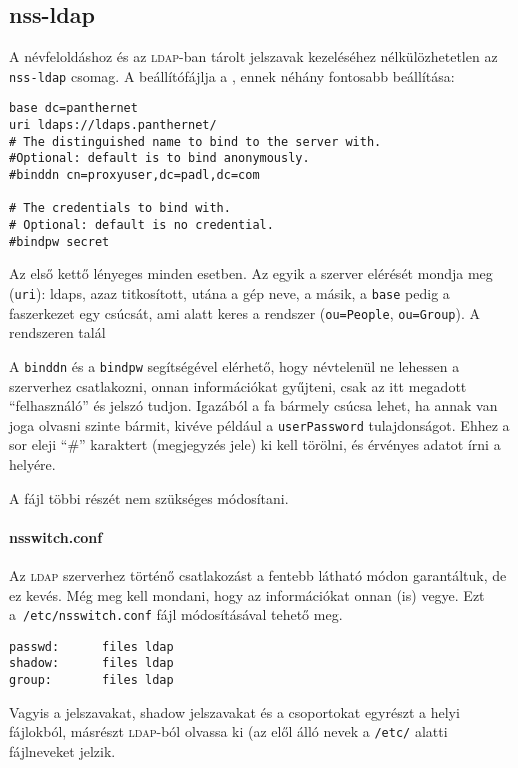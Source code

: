 \subsection{nss-ldap}
A névfeloldáshoz és az \textsc{ldap}-ban tárolt jelszavak kezeléséhez nélkülözhetetlen az \texttt{nss-ldap} csomag. A
beállítófájlja a , ennek néhány fontosabb beállítása:

\begin{Verbatim}[frame=single,label=/etc/ldap.conf részlet]
base dc=panthernet
uri ldaps://ldaps.panthernet/
# The distinguished name to bind to the server with.
#Optional: default is to bind anonymously.
#binddn cn=proxyuser,dc=padl,dc=com
  
# The credentials to bind with.
# Optional: default is no credential.
#bindpw secret
\end{Verbatim}

Az első kettő lényeges minden esetben. Az egyik a szerver elérését mondja meg (\texttt{uri}): ldaps, azaz titkosított,
utána a gép neve, a másik, a \texttt{base} pedig a faszerkezet egy csúcsát, ami alatt keres a rendszer
(\texttt{ou=People}, \texttt{ou=Group}). A rendszeren talál

A \texttt{binddn} és a \texttt{bindpw} segítségével elérhető, hogy névtelenül ne lehessen a szerverhez csatlakozni,
onnan információkat gyűjteni, csak az itt megadott ``felhasználó'' és jelszó tudjon. Igazából a fa bármely csúcsa
lehet, ha annak van joga olvasni szinte bármit, kivéve például a \texttt{userPassword} tulajdonságot. Ehhez a sor
eleji ``\#'' karaktert (megjegyzés jele) ki kell törölni, és érvényes adatot írni a helyére.

A fájl többi részét nem szükséges módosítani.


\paragraph{nsswitch.conf} Az \textsc{ldap} szerverhez történő csatlakozást a fentebb látható módon garantáltuk, de ez
kevés. Még meg kell mondani, hogy az információkat onnan (is) vegye. Ezt a~\texttt{/etc/nsswitch.conf} fájl
módosításával tehető meg.

\begin{Verbatim}[frame=single,label=/etc/nsswitch.conf \textsc{ldap}-ot használó része]
passwd:      files ldap
shadow:      files ldap
group:       files ldap
\end{Verbatim}

Vagyis a jelszavakat, shadow jelszavakat és a csoportokat egyrészt a helyi fájlokból, másrészt \textsc{ldap}-ból olvassa ki (az
elől álló nevek a \texttt{/etc/} alatti fájlneveket jelzik.

